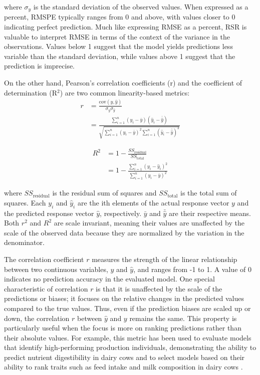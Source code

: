 where $\sigma_y$ is the standard deviation of the observed values. When expressed as a percent, RMSPE typically ranges from 0 and above, with values closer to 0 indicating perfect prediction. Much like expressing RMSE as a percent, RSR is valuable to interpret RMSE in terms of the context of the variance in the observations. Values below 1 suggest that the model yields predictions less variable than the standard deviation, while values above 1 suggest that the prediction is imprecise.

On the other hand, Pearson's correlation coefficients (r) and the coefficient of determination (R$^2$) are two common linearity-based metrics:
\begin{equation} \label{eq_r}
    \begin{aligned}
    r &= \frac{\text{cov}(y, \hat{y})}{\sigma_y \sigma_{\hat{y}}} \\
    &= \frac{\sum_{i=1}^{n} (y_i - \bar{y})(\hat{y}_i - \bar{\hat{y}})}{\sqrt{\sum_{i=1}^{n} (y_i - \bar{y})^2 \sum_{i=1}^{n} (\hat{y}_i - \bar{\hat{y}})^2}}
    \end{aligned}
\end{equation}

\begin{equation} \label{eq_R2}
    \begin{aligned}
    R^2 &= 1 - \frac{SS_{\text{residual}}}{SS_{\text{total}}} \\
    &= 1 - \frac{\sum_{i=1}^{n} (y_i - \hat{y}_i)^2}{\sum_{i=1}^{n} (y_i - \bar{y})^2}
    \end{aligned}
\end{equation}

where \(SS_{\text{residual}}\) is the residual sum of squares and \(SS_{\text{total}}\) is the total sum of squares. Each \(y_i\) and \(\hat{y}_i\) are the ith elements of the actual response vector \(y\) and the predicted response vector \(\hat{y}\), respectively. \(\bar{y}\) and \(\bar{\hat{y}}\) are their respective means. Both \(r^2\) and \(R^2\) are scale invariant, meaning their values are unaffected by the scale of the observed data because they are normalized by the variation in the denominator.

The correlation coefficient \(r\) measures the strength of the linear relationship between two continuous variables, \(y\) and \(\hat{y}\), and ranges from -1 to 1. A value of 0 indicates no prediction accuracy in the evaluated model. One special characteristic of correlation \(r\) is that it is unaffected by the scale of the predictions or biases; it focuses on the relative changes in the predicted values compared to the true values. Thus, even if the prediction biases are scaled up or down, the correlation \(r\) between \(\hat{y}\) and \(y\) remains the same. This property is particularly useful when the focus is more on ranking predictions rather than their absolute values. For example, this metric has been used to evaluate models that identify high-performing production individuals, demonstrating the ability to predict nutrient digestibility in dairy cows \citep{de_souza_predicting_2018} and to select models based on their ability to rank traits such as feed intake and milk composition in dairy cows \citep{dorea_mining_2018,rovere_prediction_2021}.

